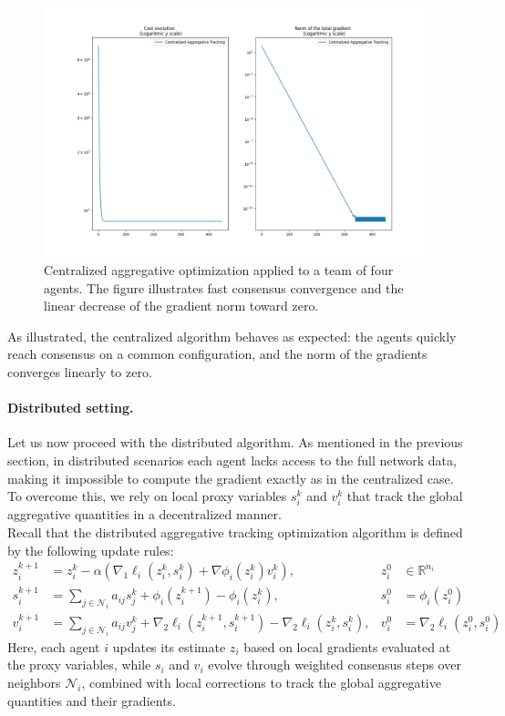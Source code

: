 \newpage
\begin{figure}[h!]
    \centering
    \includegraphics[width=0.8\linewidth]{report/figs/centralized_agt.png}
    \caption{Centralized aggregative optimization applied to a team of four agents. The figure illustrates fast consensus convergence and the linear decrease of the gradient norm toward zero.}
\end{figure}
As illustrated, the centralized algorithm behaves as expected: the agents quickly reach consensus on a common configuration, and the norm of the gradients converges linearly to zero.

\medskip
\paragraph{Distributed setting.}
Let us now proceed with the distributed algorithm.  
As mentioned in the previous section, in distributed scenarios each agent lacks access to the full network data, making it impossible to compute the gradient exactly as in the centralized case. To overcome this, we rely on local proxy variables \(s_i^k\) and \(v_i^k\) that track the global aggregative quantities in a decentralized manner.   \\
Recall that the distributed aggregative tracking optimization algorithm is defined by the following update rules:
\begin{align*}
z_i^{k+1} &= z_i^k - \alpha \left( \nabla_1 \ell_i(z_i^k, s_i^k) + \nabla \phi_i(z_i^k) v_i^k \right), & z_i^0 &\in \mathbb{R}^{n_i} \\
s_i^{k+1} &= \sum_{j \in \mathcal{N}_i} a_{ij} s_j^k + \phi_i(z_i^{k+1}) - \phi_i(z_i^k), & s_i^0 &= \phi_i(z_i^0) \\
v_i^{k+1} &= \sum_{j \in \mathcal{N}_i} a_{ij} v_j^k + \nabla_2 \ell_i(z_i^{k+1}, s_i^{k+1}) - \nabla_2 \ell_i(z_i^k, s_i^k), & v_i^0 &= \nabla_2 \ell_i(z_i^0, s_i^0)
\end{align*}
Here, each agent \(i\) updates its estimate \(z_i\) based on local gradients evaluated at the proxy variables, while \(s_i\) and \(v_i\) evolve through weighted consensus steps over neighbors \(\mathcal{N}_i\), combined with local corrections to track the global aggregative quantities and their gradients. 

